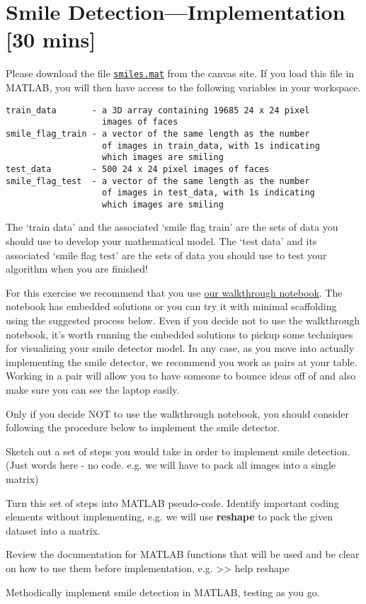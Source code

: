 \section{Smile Detection---Implementation [30 mins]}

Please download the file \href{https://canvas.instructure.com/courses/1774456/files?preview=87166282}{\texttt{smiles.mat}} from the canvas site. If you load this file in MATLAB, you will then have access to the following variables in your workspace.

\begin{verbatim}
train_data       - a 3D array containing 19685 24 x 24 pixel
                   images of faces
smile_flag_train - a vector of the same length as the number
                   of images in train_data, with 1s indicating
                   which images are smiling
test_data        - 500 24 x 24 pixel images of faces
smile_flag_test  - a vector of the same length as the number
                   of images in test_data, with 1s indicating
                   which images are smiling
\end{verbatim}

The `train data' and the associated `smile flag train' are the sets of data you should use to develop your mathematical model.  The `test data' and its associated `smile flag test' are the sets of data you should use to test your algorithm when you are finished!


\begin{prob}
For this exercise we recommend that you use \href{https://canvas.instructure.com/courses/1774456/files?preview=87166298}{our walkthrough notebook}.  The notebook has embedded solutions or you can try it with minimal scaffolding using the suggested process below.  Even if you decide not to use the walkthrough notebook, it's worth running the embedded solutions to pickup some techniques for visualizing your smile detector model.  In any case, as you move into actually implementing the smile detector, we recommend you work as pairs at your table.  Working in a pair will allow you to have someone to bounce ideas off of and also make sure you can see the laptop easily.

Only if you decide NOT to use the walkthrough notebook, you should consider following the procedure below to implement the smile detector.
\be
\item Sketch out a set of steps you would take in order to implement smile detection. (Just words here - no code. e.g. we will have to pack all images into a single matrix)
\item Turn this set of steps into MATLAB pseudo-code. Identify important coding elements without implementing, e.g. we will use \textbf{reshape} to pack the given dataset into a matrix.
\item Review the documentation for MATLAB functions that will be used and be clear on how to use them before implementation, e.g. >> help reshape 
\item Methodically implement smile detection in MATLAB, testing as you go.
\ee
\end{prob}

